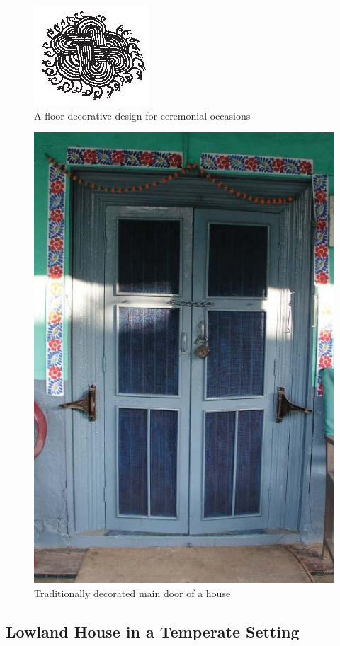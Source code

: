 \begin{figure}[!htbp]
\includegraphics[scale=1.21]{images/chap02-03.jpg}
\caption{A floor decorative design for ceremonial occasions}\label{chap02-fig03}
\end{figure}


\begin{figure}[!htbp]
\includegraphics[scale=.3]{images/chap02-04.jpg}
\caption{Traditionally decorated main door of a house}\label{chap02-fig04}
\end{figure}


\subsection*{Lowland House in a Temperate Setting}


